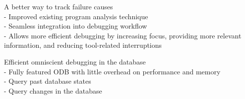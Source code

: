 A better way to track failure causes
\\- Improved existing program analysis technique 
\\- Seamless integration into debugging workflow
\\- Allows more efficient debugging by increasing focus, providing more relevant information, and reducing tool-related interruptions

Efficient omniscient debugging in the database
\\- Fully featured ODB with little overhead on performance and memory
\\- Query past database states
\\- Query changes in the database


